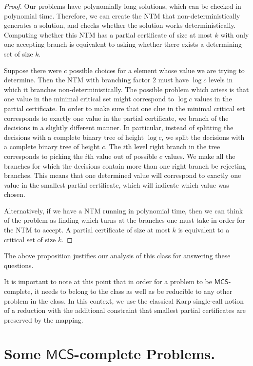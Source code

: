 \documentclass[runningheads,a4paper]{llncs}
\begin{document}
\begin{definition}
\begin{proof}
Our problems have polynomially long solutions, which can be checked in polynomial time. Therefore, we can create the NTM that non-deterministically generates a solution, and checks whether the solution works deterministically. Computing whether this NTM has a partial certificate of size at most $k$ with only one accepting branch is equivalent to asking whether there exists a determining set of size $k$. 

Suppose there were $c$ possible choices for a element whose value we are trying to determine. Then the NTM with branching factor $2$ must have $\log c$ levels in which it branches non-deterministically. The possible problem which arises is that one value in the minimal critical set might correspond to $\log c$ values in the partial certificate. In order to make sure that one clue in the minimal critical set corresponds to exactly one value in the partial certificate, we branch of the decisions in a slightly different manner. In particular, instead of splitting the decisions with a complete binary tree of height $\log c$, we split the decisions with a complete binary tree of height $c$. The $i$th level right branch in the tree corresponds to picking the $i$th value out of possible $c$ values. We make all the branches for which the decisions contain more than one right branch be rejecting branches. This means that one determined value will correspond to exactly one value in the smallest partial certificate, which will indicate which value was chosen.

Alternatively, if we have a NTM running in polynomial time, then we can think of the problem as finding which turns at the branches one must take in order for the NTM to accept. A partial certificate of size at most $k$ is equivalent to a critical set of size $k$.
\end{proof}

The above proposition justifies our analysis of this class for answering these questions.

It is important to note at this point that in order for a problem to be $\mathsf{MCS}$-complete, it needs to belong to the class as well as be reducible to any other problem in the class. In this context, we use the classical Karp single-call notion of a reduction with the additional constraint that smallest partial certificates are preserved by the mapping.

\section{Some $\mathsf{MCS}$-complete Problems.}
\label{sec:The Problems}


\end{definition}
\end{document}
